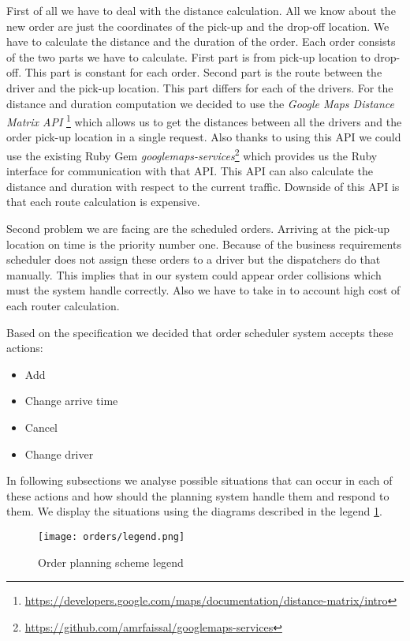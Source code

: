 First of all we have to deal with the distance calculation. All we know about the new order are just the coordinates of the pick-up and the drop-off location. We have to calculate the distance and the duration of the order. Each order consists of the two parts we have to calculate. First part is from pick-up location to drop-off. This part is constant for each order. Second part is the route between the driver and the pick-up location. This part differs for each of the drivers. For the distance and duration computation we decided to use the \textit{Google Maps Distance Matrix API} \footnote{\url{https://developers.google.com/maps/documentation/distance-matrix/intro}} which allows us to get the distances between all the drivers and the order pick-up location in a single request. Also thanks to using this API we could use the existing Ruby Gem \textit{googlemaps-services}\footnote{\url{https://github.com/amrfaissal/googlemaps-services}} which provides us the Ruby interface for communication with that API. This API can also calculate the distance and duration with respect to the current traffic. Downside of this API is that each route calculation is expensive.

Second problem we are facing are the scheduled orders. Arriving at the pick-up location on time is the priority number one. Because of the business requirements scheduler does not assign these orders to a driver but the dispatchers do that manually. This implies that in our system could appear order collisions which must the system handle correctly. Also we have to take in to account high cost of each router calculation.

Based on the specification we decided that order scheduler system accepts these actions:
\begin{itemize}
	\item Add
	\item Change arrive time
	\item Cancel
	\item Change driver
\end{itemize}


In following subsections we analyse possible situations that can occur in each of these actions and how should the planning system handle them and respond to them. We display the situations using the diagrams described in the legend \ref{order-planning-legend}.

\begin{figure}[h]\centering
	\texttt{[image: orders/legend.png]}
	\caption{Order planning scheme legend}\label{order-planning-legend}
\end{figure} 



